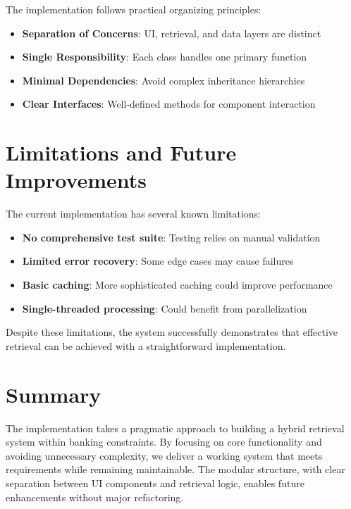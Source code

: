 The implementation follows practical organizing principles:

\begin{itemize}[leftmargin=*,itemsep=2pt,topsep=2pt]
 \item \textbf{Separation of Concerns}: UI, retrieval, and data layers are distinct
 \item \textbf{Single Responsibility}: Each class handles one primary function
 \item \textbf{Minimal Dependencies}: Avoid complex inheritance hierarchies
 \item \textbf{Clear Interfaces}: Well-defined methods for component interaction
\end{itemize}

\section{Limitations and Future Improvements}

The current implementation has several known limitations:

\begin{itemize}[leftmargin=*,itemsep=2pt,topsep=2pt]
 \item \textbf{No comprehensive test suite}: Testing relies on manual validation
 \item \textbf{Limited error recovery}: Some edge cases may cause failures
 \item \textbf{Basic caching}: More sophisticated caching could improve performance
 \item \textbf{Single-threaded processing}: Could benefit from parallelization
\end{itemize}

Despite these limitations, the system successfully demonstrates that effective retrieval can be achieved with a straightforward implementation.

\section{Summary}

The implementation takes a pragmatic approach to building a hybrid retrieval system within banking constraints. By focusing on core functionality and avoiding unnecessary complexity, we deliver a working system that meets requirements while remaining maintainable. The modular structure, with clear separation between UI components and retrieval logic, enables future enhancements without major refactoring.

